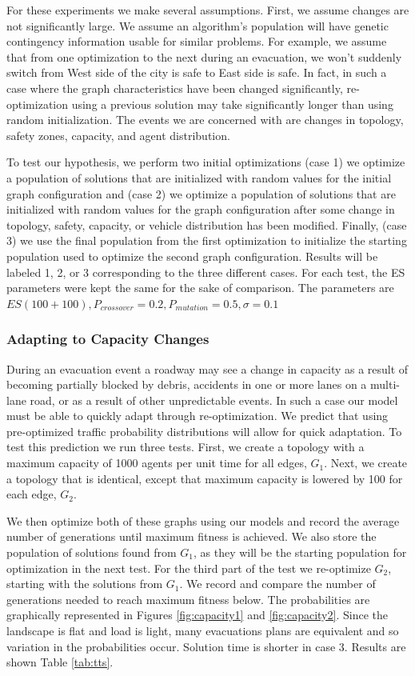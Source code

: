 \documentclass{sig-alternate-05-2015}
\begin{document}
For these experiments we make several assumptions.  First, we assume
changes are not significantly large.  We assume an algorithm's
population will have genetic contingency information usable for
similar problems.  For example, we assume that from one optimization
to the next during an evacuation, we won't suddenly switch from West
side of the city is safe to East side is safe.  In fact, in such a
case where the graph characteristics have been changed significantly,
re-optimization using a previous solution may take significantly
longer than using random initialization.  The events we are concerned
with are changes in topology, safety zones, capacity, and agent
distribution.

To test our hypothesis, we perform two initial optimizations (case 1)
we optimize a population of solutions that are initialized with random
values for the initial graph configuration and (case 2) we optimize a
population of solutions that are initialized with random values for
the graph configuration after some change in topology, safety,
capacity, or vehicle distribution has been modified.  Finally, (case
3) we use the final population from the first optimization to
initialize the starting population used to optimize the second graph
configuration.  Results will be labeled 1, 2, or 3 corresponding to
the three different cases.  For each test, the ES parameters
were kept the same for the sake of comparison.  The parameters are
$ES(100+100), P_{crossover}=0.2, P_{mutation}=0.5, \sigma=0.1$

\subsubsection{Adapting to Capacity Changes}
During an evacuation event a roadway may see a change in capacity as a
result of becoming partially blocked by debris, accidents in one or
more lanes on a multi-lane road, or as a result of other unpredictable
events.  In such a case our model must be able to quickly adapt
through re-optimization.  We predict that using pre-optimized traffic
probability distributions will allow for quick adaptation.  To test
this prediction we run three tests.  First, we create a topology with
a maximum capacity of 1000 agents per unit time for all edges,
$G_1$.  Next, we create a topology that is identical, except that
maximum capacity is lowered by 100 for each edge, $G_2$.

We then optimize both of these graphs using our models and record the
average number of generations until maximum fitness is achieved.  We
also store the population of solutions found from $G_1$, as they will
be the starting population for optimization in the next test.  For the
third part of the test we re-optimize $G_2$, starting with the
solutions from $G_1$.  We record and compare the number of generations
needed to reach maximum fitness below.  The probabilities are
graphically represented in Figures \ref{fig:capacity1} and
\ref{fig:capacity2}.  Since the landscape is flat and load is light,
many evacuations plans are equivalent and so variation in the
probabilities occur.  Solution time is shorter in case 3.  Results are
shown Table \ref{tab:tts}.
\end{document}
